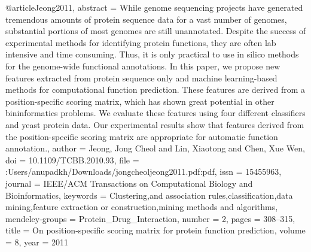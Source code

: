 @article{Jeong2011,
abstract = {While genome sequencing projects have generated tremendous amounts of protein sequence data for a vast number of genomes, substantial portions of most genomes are still unannotated. Despite the success of experimental methods for identifying protein functions, they are often lab intensive and time consuming. Thus, it is only practical to use in silico methods for the genome-wide functional annotations. In this paper, we propose new features extracted from protein sequence only and machine learning-based methods for computational function prediction. These features are derived from a position-specific scoring matrix, which has shown great potential in other bininformatics problems. We evaluate these features using four different classifiers and yeast protein data. Our experimental results show that features derived from the position-specific scoring matrix are appropriate for automatic function annotation.},
author = {Jeong, Jong Cheol and Lin, Xiaotong and Chen, Xue Wen},
doi = {10.1109/TCBB.2010.93},
file = {:Users/anupadkh/Downloads/jongcheoljeong2011.pdf:pdf},
issn = {15455963},
journal = {IEEE/ACM Transactions on Computational Biology and Bioinformatics},
keywords = {Clustering,and association rules,classification,data mining,feature extraction or construction,mining methods and algorithms},
mendeley-groups = {Protein{\_}Drug{\_}Interaction},
number = {2},
pages = {308--315},
title = {{On position-specific scoring matrix for protein function prediction}},
volume = {8},
year = {2011}
}
